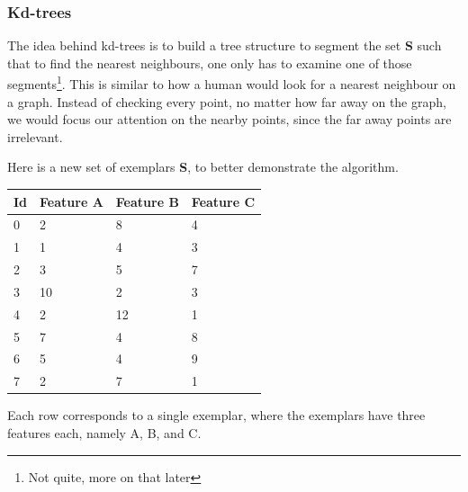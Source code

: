 \documentclass[a4paper, 12pt]{article}
\begin{document}
                \subsubsection{Kd-trees}
                
                    \par The idea behind kd-trees is to build a tree structure to segment the set \textbf{S} such that to find the nearest neighbours, one only has to examine one of those segments\footnote{Not quite, more on that later}. This is similar to how a human would look for a nearest neighbour on a graph. Instead of checking every point, no matter how far away on the graph, we would focus our attention on the nearby points, since the far away points are irrelevant.
                    
                    \newpage
                    
                    \par Here is a new set of exemplars \textbf{S}, to better demonstrate the algorithm.
                    
                    \begin{center}
                        \begin{tabular}{| l | l | l | l |}
                            \hline
                            Id & Feature A & Feature B & Feature C \\ \hline
                            0 & 2 & 8 & 4 \\ \hline
                            1 & 1 & 4 & 3 \\ \hline
                            2 & 3 & 5 & 7 \\ \hline
                            3 & 10 & 2 & 3 \\ \hline
                            4 & 2 & 12 & 1 \\ \hline
                            5 & 7 & 4 & 8 \\ \hline
                            6 & 5 & 4 & 9 \\ \hline
                            7 & 2 & 7 & 1 \\ \hline
                             
                        \end{tabular}  
                    \end{center}                
                    
                    \par Each row corresponds to a single exemplar, where the exemplars have three features each, namely A, B, and C.
                    
\end{document}
